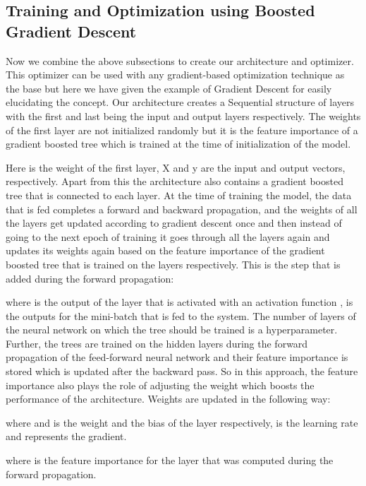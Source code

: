 \documentclass[review]{elsarticle}
\begin{document}
\subsection{Training and Optimization using Boosted Gradient Descent }
Now we combine the above subsections to create our architecture and optimizer. This optimizer can be used with any gradient-based optimization technique as the base but here we have given the example of Gradient Descent for easily elucidating the concept. Our architecture creates a Sequential structure of layers with the first and last being the input and output layers respectively. The weights of the first layer are not initialized randomly but it is the feature importance of a gradient boosted tree which is trained at the time of initialization of the model. 

Here  is the weight of the first layer, X and y are the input and output vectors, respectively. Apart from this the architecture also contains a gradient boosted tree that is connected to each layer. At the time of training the model, the data that is fed completes a forward and backward propagation, and the weights of all the layers get updated according to gradient descent once and then instead of going to the next epoch of training it goes through all the layers again and updates its weights again based on the feature importance of the gradient boosted tree that is trained on the layers respectively. This is the step that is added during the forward propagation:

where  is the output of the  layer that is activated with an activation function ,  is the outputs for the mini-batch that is fed to the system.
The number of layers of the neural network on which the tree should be trained is a hyperparameter. Further, the trees are trained on the hidden layers during the forward propagation of the feed-forward neural network and their feature importance is stored which is updated after the backward pass. So in this approach, the feature importance also plays the role of adjusting the weight which boosts the performance of the architecture. Weights are updated in the following way: 

where  and  is the weight and the bias of the  layer respectively,  is the learning rate and  represents the gradient.

where  is the feature importance for the  layer that was computed during the forward propagation.
\end{document}
